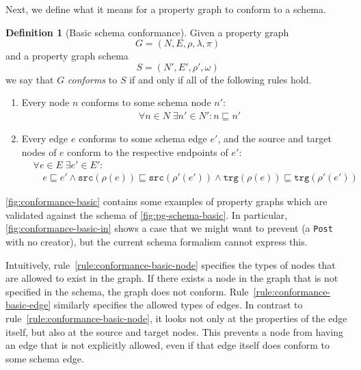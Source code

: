 \documentclass{article}
\theoremstyle{definition}
\newtheorem{definition}{Definition}
\newcommand{\src}{\mathtt{src}}
\newcommand{\trg}{\mathtt{trg}}
\newcommand{\conf}{\sqsubseteq}
\begin{document}
Next, we define what it means for a property graph to conform to a schema.

\begin{definition}[Basic schema conformance]
  \label{def:schema-conformance-basic}
  Given a property graph $$G = (N, E, \rho, \lambda, \pi)$$ and a property graph schema $$S = (N', E', \rho', \omega)$$ we say that $G$ \emph{conforms} to $S$ if and only if all of the following rules hold.

  \begin{enumerate}
    \item\label{rule:conformance-basic-node}
          Every node $n$ conforms to some schema node $n'$:
          \begin{align*}
             & \forall n \in N \; \exists n' \in N' : n \conf n'
          \end{align*}

    \item\label{rule:conformance-basic-edge}
          Every edge $e$ conforms to some schema edge $e'$, and the source and target nodes of $e$ conform to the respective endpoints of $e'$:
          \begin{align*}
             & \forall e \in E \; \exists e' \in E' :                      \\
             & \quad e \conf e' \wedge \src(\rho(e)) \conf \src(\rho'(e'))
            \wedge \trg(\rho(e)) \conf \trg(\rho'(e'))
          \end{align*}
  \end{enumerate}
\end{definition}

\autoref{fig:conformance-basic} contains some examples of property graphs which are validated against the schema of \autoref{fig:pg-schema-basic}. In particular, \autoref{fig:conformance-basic-in} shows a case that we might want to prevent (a \texttt{Post} with no creator), but the current schema formalism cannot express this.

Intuitively, rule~\ref{rule:conformance-basic-node} specifies the types of nodes that are allowed to exist in the graph. If there exists a node in the graph that is not specified in the schema, the graph does not conform. Rule~\ref{rule:conformance-basic-edge} similarly specifies the allowed types of edges. In contrast to rule~\ref{rule:conformance-basic-node}, it looks not only at the properties of the edge itself, but also at the source and target nodes. This prevents a node from having an edge that is not explicitly allowed, even if that edge itself does conform to some schema edge.
\end{document}
